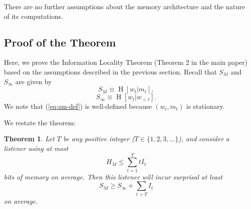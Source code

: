 \documentclass[11pt,letterpaper]{article}
\newcommand\mhahn[1]{{\color{red}(#1)}}
\newcounter{theorem}
\newtheorem{thm}[theorem]{Theorem}
\begin{document}



There are no further assumptions about the memory architecture and the nature of its computations.


\subsection{Proof of the Theorem}\label{sec:proof}

Here, we prove the Information Locality Theorem (Theorem 2 in the main paper) based on the assumptions described in the previous section.
	Recall that $S_M$ and $S_\infty$ are given by
	\begin{equation}\label{eq:sm-def}
		    S_M \equiv \operatorname{H}[w_t|m_t],
	\end{equation}
	\begin{equation}
		S_\infty \equiv \operatorname{H}[w_t|w_{<t}].
	\end{equation}
We note that (\ref{eq:sm-def}) is well-defined because $(w_t, m_t)$ is stationary.

We restate the theorem:

\begin{thm}\label{prop:suboptimal}
	Let $T$ be any positive integer ($T \in \{1, 2, 3, ...\}$), and consider a listener using at most
	\begin{equation}\label{eq:memory}
H_M \leq \sum_{t=1}^T t I_t
	\end{equation}
bits of memory on average.
Then this listener will incur surprisal at least
	\begin{equation}
	S_M \geq S_\infty + \sum_{t > T} I_t
	\end{equation}
	on average.
\end{thm}
\end{document}
